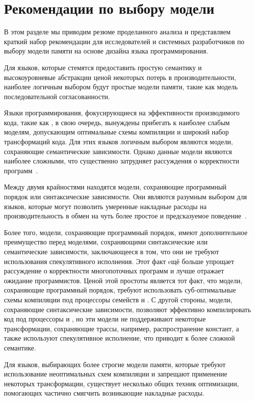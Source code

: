 \section{Рекомендации по выбору модели}
\label{sec:discussion}

В этом разделе мы приводим резюме проделанного анализа  
и представляем краткий набор рекомендации для 
исследователей и системных разработчиков 
по выбору модели памяти на основе дизайна языка программирования.

Для языков, которые стемятся предоставить простую семантику 
и высокоуровневые абстракции ценой некоторых потерь в 
производительности, наиболее логичным выбором 
будут простые модели памяти, такие как 
модель последовательной согласованности. 

Языки программирования, фокусирующиеся на 
эффективности производимого кода, 
такие как \CPP, в свою очередь, вынуждены 
прибегать к наиболее слабым моделям, 
допускающим оптимальные схемы компиляции и 
широкий набор трансформаций кода. 
Для этих языков логичным выбором являются 
модели, сохраняющие семантические зависимости. 
Однако данные модели являются наиболее сложными, 
что существенно затрудняет рассуждения о 
корректности программ~\cite{Svendsen-al:ESOP18}. 

Между двумя крайностями находятся модели, 
сохраняющие программный порядок или синтаксические зависимости. 
Они являются разумным выбором для языков, 
которые могут позволить умеренные накладные 
расходы на производительность в обмен 
на чуть более простое и предсказуемое поведение~\cite{Ou-Demsky:OOPSLA18}. 

Более того, модели, сохраняющие программный порядок, 
имеют дополнительное преимущество перед моделями, 
сохраняющими синтаксические или семантические зависимости, 
заключающееся в том, что они не требуют использования 
спекулятивного исполнения. 
Этот факт eщё больше упрощает рассуждение о корректности 
многопоточных программ и лучше отражает ожидание программистов. 
Ценой этой простоты является тот факт, 
что модели, сохраняющие программный порядок, 
требуют использовать суб-оптимальные схемы компиляции 
под процессоры семейств \ARM и \POWER.
С другой стороны, модели, сохраняющие синтаксические зависимости, 
позволяют эффективно компилировать код под процессоры \ARM и \POWER,
но эти модели не поддерживают некоторые трансформации, 
сохраняющие трассы, например, распространение констант, 
а также используют спекулятивное исполнение, 
что приводит к более сложной семантике.  

Для языков, выбирающих более строгие модели памяти, 
которые требуют использование неоптимальных схем компиляции 
и запрещают применение некоторых трансформации, 
существует несколько общих техник оптимизации, 
помогающих частично смягчить возникающие накладные расходы. 

